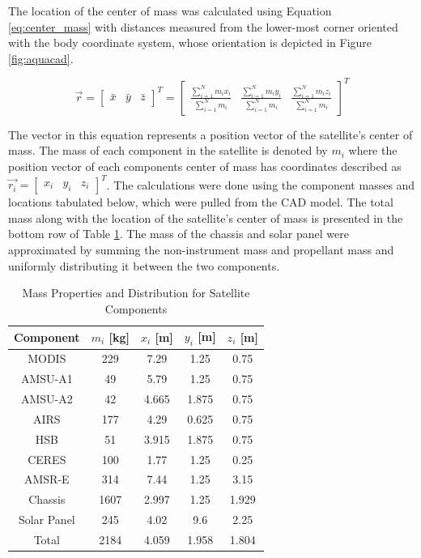 The location of the center of mass was calculated using Equation \ref{eq:center_mass} with distances measured from the lower-most corner oriented with the body coordinate system, whose orientation is  depicted in Figure \ref{fig:aquacad}. 

\begin{equation} \label{eq:center_mass}
    \vec{r} = \begin{bmatrix}
        \bar{x} & \bar{y} & \bar{z}
    \end{bmatrix}^T = \begin{bmatrix}
        \frac{\sum_{i=1}^N{m_i x_i}}{\sum_{i = 1}^N{m_i}} & \frac{\sum_{i=1}^N{m_i y_i}}{\sum_{i = 1}^N{m_i}} & \frac{\sum_{i=1}^N{m_i z_i}}{\sum_{i = 1}^N{m_i}}
    \end{bmatrix}^T
\end{equation}

The vector in this equation represents a position vector of the satellite's center of mass. The mass of each component in the satellite is denoted by $m_i$ where the position vector of each components center of mass has coordinates described as $\vec{r_i} = \begin{bmatrix}
    x_i & y_i & z_i
\end{bmatrix}^T$. The calculations were done using the component masses and locations tabulated below, which were pulled from the CAD model. The total mass along with the location of the satellite's center of mass is presented in the bottom row of Table \ref{tab:mass_props}. The mass of the chassis and solar panel were approximated by summing the non-instrument mass and propellant mass and uniformly distributing it between the two components.

\begin{table}[H]
    \centering
    \begin{tabular}{c|cccc}
    Component & $m_i$ [kg] & $x_i$ [m] & $y_i$ [m] & $z_i$ [m] \\ \hline
    MODIS     &    229   &    7.29   &   1.25    &   0.75    \\
    AMSU-A1   &     49  &    5.79   &    1.25   &   0.75    \\
    AMSU-A2    &    42   &    4.665   &   1.875    &  0.75   \\
    AIRS        &    177   &    4.29   &   0.625    &   0.75    \\
    HSB         &    51   &     3.915  &    1.875   &    0.75   \\
    CERES       &   100    &    1.77   &   1.25    &   0.25    \\
    AMSR-E      &    314   &    7.44   &    1.25   &   3.15    \\
    Chassis     &     1607  &    2.997   &   1.25    &    1.929   \\
    Solar Panel     &   245    &   4.02    &   9.6    &    2.25   \\ \hline
    Total       & 2184      & 4.059     & 1.958     & 1.804
    \end{tabular}
    \caption{Mass Properties and Distribution for Satellite Components}
    \label{tab:mass_props}
\end{table}


